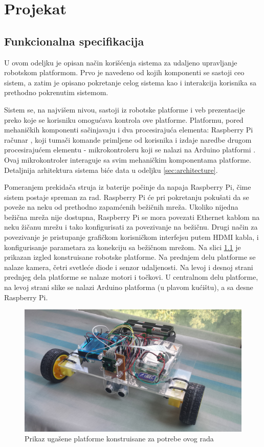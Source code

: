 \documentclass[12pt,a4paper]{report}
\begin{document}
\newpage

\chapter{Projekat}
\section{Funkcionalna specifikacija}

U ovom odeljku je opisan način korišćenja sistema za udaljeno upravljanje robotskom platformom. Prvo je navedeno od kojih komponenti se sastoji ceo sistem, a zatim je opisano pokretanje celog sistema kao i interakcija korisnika sa prethodno pokrenutim sistemom.

Sistem se, na najvišem nivou, sastoji iz robotske platforme i veb prezentacije preko koje se korisniku omogućava kontrola ove platforme. Platformu, pored mehaničkih komponenti sačinjavaju i dva procesirajuća elementa: Raspberry Pi računar \cite{pi}, koji tumači komande primljene od korisnika i izdaje naredbe drugom procesirajućem elementu - mikrokontroleru koji se nalazi na Arduino platformi \cite{arduino}. Ovaj mikrokontroler interaguje sa svim mehaničkim komponentama platforme. Detaljnija arhitektura sistema biće data u odeljku \ref{sec:architecture}. 

Pomeranjem prekidača struja iz baterije počinje da napaja Raspberry Pi, čime sistem postaje spreman za rad. Raspberry Pi će pri pokretanju pokušati da se poveže na neku od prethodno zapamćenih bežičnih mreža. Ukoliko nijedna bežična mreža nije dostupna, Raspberry Pi se mora povezati Ethernet kablom na neku žičanu mrežu i tako konfigurisati za povezivanje na bežičnu. Drugi način za povezivanje je pristupanje grafičkom korisničkom interfejsu putem HDMI kabla, i konfigurisanje parametara za konekciju sa bežičnom mrežom. Na slici \ref{fig:myobot} je prikazan izgled konstruisane robotske platforme. Na prednjem delu platforme se nalaze kamera, četri svetleće diode i senzor udaljenosti. Na levoj i desnoj strani prednjeg dela platforme se nalaze motori i točkovi. U centralnom delu platforme, na levoj strani slike se nalazi Arduino platforma (u plavom kućištu), a sa desne Raspberry Pi.

\begin{figure}[H]
    \centering
    \includegraphics[width=16cm, keepaspectratio]{img/myobot.jpg}
    \caption{Prikaz ugašene platforme konstruisane za potrebe ovog rada}
    \label{fig:myobot}
\end{figure}
\end{document}
